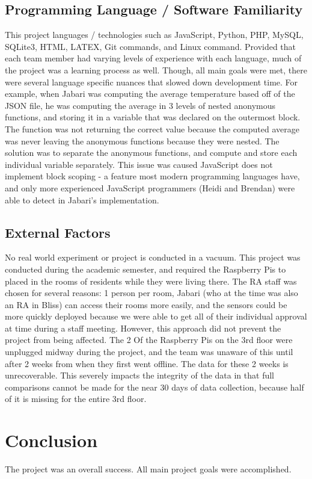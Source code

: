 \documentclass{article}
\begin{document}
		\subsection{Programming Language / Software Familiarity}
			This project languages / technologies such as JavaScript, Python, PHP, MySQL, SQLite3, HTML, LATEX, Git commands, and Linux command. Provided
			that each team member had varying levels of experience with each language, much of the project was a learning process as well. Though, all main 
			goals were met, there were several language specific nuances that slowed down development time. For example, when Jabari was computing the average
			temperature based off of the JSON file, he was computing the average in 3 levels of nested anonymous functions, and storing it in a variable 
			that was declared on the outermost block. The function was not returning the correct value because the computed average was never leaving the 
			anonymous functions because they were nested. The solution was to separate the anonymous functions, and compute and store each individual variable 
			separately. This issue was caused JavaScript does not implement block scoping - a feature most modern programming languages have, and only more
			experienced JavaScript programmers (Heidi and Brendan) were able to detect in Jabari's implementation.
		
		\subsection{External Factors}
			No real world experiment or project is conducted in a vacuum. This project was conducted during the academic semester, and required the 
			Raspberry Pis to placed in the rooms of residents while they were living there. The RA staff was chosen for several reasons: 1 person per room,
			Jabari (who at the time was also an RA in Bliss) can access their rooms more easily, and the sensors could be more quickly deployed because
			we were able to get all of their individual approval at time during a staff meeting. However, this approach did not prevent the project from
			being affected. The 2 Of the Raspberry Pis on the 3rd floor were unplugged midway during the project, and the team was unaware of this until after 
			2 weeks from when they first went offline. The data for these 2 weeks is unrecoverable. This severely impacts the integrity of the data in 
			that full comparisons cannot be made for the near 30 days of data collection, because half of it is missing for the entire 3rd floor. 
			
	\newpage
	\section{Conclusion}\label{sec:conclusion}
		The project was an overall success. All main project goals were accomplished.
\end{document}
